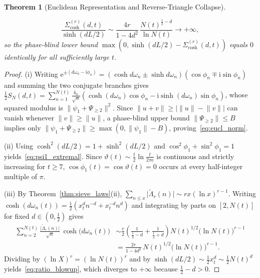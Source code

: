 \documentclass[11pt,reqno]{amsart}
\newtheorem{theorem}{Theorem}[section]
\theoremstyle{definition}
\theoremstyle{remark}
\numberwithin{equation}{section}
\newcommand{\ii}{\mathrm{i}}
\newcommand{\ee}{\mathrm{e}}
\begin{document}
\begin{theorem}[Euclidean Representation and Reverse-Triangle Collapse]
\begin{enumerate}[label=\textup{(\roman*)},leftmargin=2.2em]
\begin{equation}\label{eq:ratio_blowup}
\frac{\Sigma_{\cosh}^{(r)}(d,t)}{\sinh(dL/2)} \sim \frac{4r}{1 - 4d^2}\,\frac{N(t)^{\frac{1}{2}-d}}{\ln N(t)} \longrightarrow +\infty,
\end{equation}
so the phase-blind lower bound $\max(0, \sinh(dL/2) - \Sigma_{\cosh}^{(r)}(d,t))$ equals $0$ identically for all sufficiently large $t$.
\end{enumerate}
\end{theorem}

\begin{proof}
(i) Writing $\ee^{\pm(d\omega_n - \ii\phi_n)} = (\cosh d\omega_n \pm \sinh d\omega_n)(\cos\phi_n \mp \ii\sin\phi_n)$ and summing the two conjugate branches gives $\frac{1}{2}S_N(d,t) = \sum_{n=1}^{N(t)} \frac{b_n}{\sqrt{n}}(\cosh(d\omega_n)\cos\phi_n - \ii\sinh(d\omega_n)\sin\phi_n)$, whose squared modulus is $\lVert\psi_1 + \Psi_{\ge 2}\rVert^2$. Since $\lVert u + v\rVert \ge \lvert\lVert u\rVert - \lVert v\rVert\rvert$ can vanish whenever $\lVert v\rVert \ge \lVert u\rVert$, a phase-blind upper bound $\lVert\Psi_{\ge 2}\rVert \le B$ implies only $\lVert\psi_1 + \Psi_{\ge 2}\rVert \ge \max(0, \lVert\psi_1\rVert - B)$, proving~\eqref{eq:eucl_norm}.

(ii) Using $\cosh^2(dL/2) = 1 + \sinh^2(dL/2)$ and $\cos^2\phi_1 + \sin^2\phi_1 = 1$ yields~\eqref{eq:psi1_extremal}. Since $\vartheta(t) \sim \frac{t}{2}\ln\frac{t}{2\pi\ee}$ is continuous and strictly increasing for $t \ge 7$, $\cos\phi_1(t) = \cos\vartheta(t) = 0$ occurs at every half-integer multiple of $\pi$.

(iii) By Theorem~\ref{thm:sieve_laws}(ii), $\sum_{n \le x}\lvert\widetilde{\Lambda}_r(n)\rvert \sim r x(\ln x)^{r-1}$. Writing $\cosh(d\omega_n(t)) = \frac{1}{2}(x_t^d n^{-d} + x_t^{-d} n^d)$ and integrating by parts on $[2, N(t)]$ for fixed $d \in (0, \frac{1}{2})$ gives
\begin{align*}
\sum_{n=2}^{N(t)} \frac{\lvert\widetilde{\Lambda}_r(n)\rvert}{\sqrt{n}}\,\cosh\bigl(d\omega_n(t)\bigr) &\sim \frac{r}{2}\left(\frac{1}{\frac{1}{2}-d} + \frac{1}{\frac{1}{2}+d}\right)N(t)^{1/2}\bigl(\ln N(t)\bigr)^{r-1} \\
&= \frac{2r}{1-4d^2}\,N(t)^{1/2}\bigl(\ln N(t)\bigr)^{r-1}.
\end{align*}
Dividing by $(\ln X)^r = (\ln N(t))^r$ and by $\sinh(dL/2) \sim \frac{1}{2}x_t^d \sim \frac{1}{2}N(t)^d$ yields~\eqref{eq:ratio_blowup}, which diverges to $+\infty$ because $\frac{1}{2} - d > 0$.
\end{proof}
\end{document}
